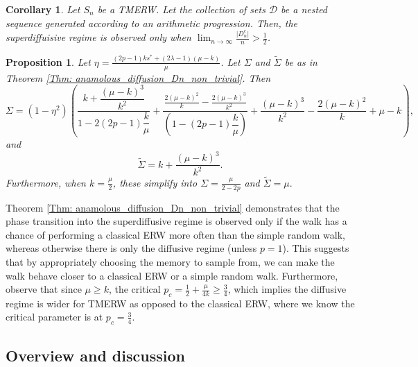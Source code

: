 \documentclass{article}
\numberwithin{equation}{section}
\newtheorem{proposition}[theorem]{Proposition}
\newtheorem{corollary}[theorem]{Corollary}
\newcommand{\DD}{\mbox{${\mathcal D}$}}
\newcommand{\1}{\mathbf{1}}
\newcommand{\0}{\mathbf{0}}
\begin{document}
\begin{corollary}
\label{Cor: Anomolous_diffusion}
Let $S_n$ be a TMERW. Let the collection of sets $\DD$ be a nested sequence generated according to an arithmetic progression. Then, the superdiffuisive regime is observed only when $\lim_{n \to \infty}\frac{\lvert D_n^c \rvert}{n}>\frac{1}{2}$.
\end{corollary}

\begin{proposition}\label{prop: limiting variance}
Let $\eta = \frac{(2p-1)ks^*+(2\lambda-1)(\mu-k)}{\mu}$. Let $\Sigma$ and $\widetilde{\Sigma}$ be as in Theorem \ref{Thm: anamolous_diffusion_Dn_non_trivial}. Then \[\Sigma = (1-\eta^2)\left(\frac{k+ \dfrac{(\mu-k)^3}{k^2}}{1-2(2p-1)\dfrac{k}{\mu}} + \frac{\frac{2(\mu-k)^2}{k}-\frac{2(\mu-k)^3}{k^2}}{\left(1-(2p-1)\dfrac{k}{\mu}\right)}+\frac{(\mu-k)^3}{k^2} - \frac{2(\mu-k)^2}{k} + \mu-k \right),\] and 
\[\widetilde{\Sigma} = k + \frac{(\mu-k)^3}{k^2}.\]
Furthermore, when $k = \frac{\mu}{2}$, these simplify into $\Sigma = \frac{\mu}{2-2p}$ and $\widetilde{\Sigma} = \mu. $
\end{proposition}



Theorem \ref{Thm: anamolous_diffusion_Dn_non_trivial} demonstrates that the phase transition into the superdiffusive regime is observed only if the walk has a chance of performing a classical ERW more often than the simple random walk, whereas otherwise there is only the diffusive regime (unless $p=1$). This suggests that by appropriately choosing the memory to sample from, we can make the walk behave closer to a classical ERW or a simple random walk. Furthermore, observe that since $\mu \ge k$, the critical $p_c=\frac{1}{2}+\frac{\mu}{4k} \ge \frac{3}{4}$, which implies the diffusive regime is wider for TMERW as opposed to the classical ERW, where we know the critical parameter is at $p_c= \frac{3}{4}$.  

\subsection{Overview and discussion}
\end{document}
